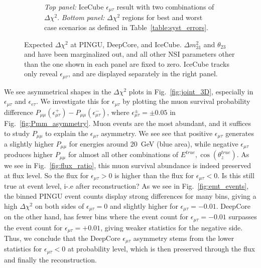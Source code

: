 \documentclass[draft=True]{revtex4-2}
\newcommand{\ztrue}{\ensuremath{\cos{(\theta_z^{true})}}}
\newcommand{\emt}{\ensuremath{\epsilon_{\mu\tau}}}
\newcommand{\eet}{\epsilon_{e\tau}}
\newcommand{\Etrue}{E^{true}}
\newcommand{\dm}{\Delta m^2_{31}}
\begin{document}
{\begin{figure}[!tb]
\begin{center}
\begin{subfigure}{0.45\textwidth}
         \caption{\emph{Top panel:} IceCube $\emt$ result with two combinations of $\Delta \chi^2$.
                  \emph{Bottom panel:} $\Delta \chi^2$ regions for best and worst case scenarios as defined in Table~\ref{table:syst_errors}.}\label{fig:IC_3D}
      \end{subfigure}
    \caption{Expected $\Delta \chi^2$ at PINGU, DeepCore, and IceCube.
    $\dm$ and $\theta_{23}$ and have been marginalized out, and all other NSI 
    parameters other than the one shown in each panel are fixed to zero. IceCube tracks only reveal $\emt$, and are displayed separately in the right panel.}\label{fig:3D_NO}
   \end{center}
\end{figure}

We see asymmetrical shapes in the $\Delta \chi^2$ plots in Fig.~\ref{fig:joint_3D}, especially in $\emt$ and $\eet$.%
We investigate this for $\emt$ by plotting the muon survival probability difference $P_{\mu\mu}(\epsilon^+_{\mu\tau}) - P_{\mu\mu}(\epsilon^-_{\mu\tau})$, where 
$\epsilon^\pm_{\mu\tau} = \pm 0.05$ in Fig.~\ref{fig:Pmm_asymmetry}. Muon events are the most abundant, and it suffices to study $P_{\mu\mu}$ to explain the $\emt$ asymmetry. 
We see see that positive $\emt$ generates a slightly higher $P_{\mu\mu}$ for energies around \SI{20}{\GeV} (blue area),
while negative $\emt$ produces higher $P_{\mu\mu}$ for almost all other combinations of ${\Etrue,\ztrue}$. As we see in Fig.~\ref{fig:flux_ratio}, this muon survival abundance 
is indeed preserved at flux level. So the flux for $\emt>0$ is higher than the flux for $\emt<0$. Is this still true at event level, i-.e after reconstruction? 
As we see in Fig.~\ref{fig:emt_events}, the binned PINGU event counts display strong differences for many bins, giving a high $\Delta \chi^2$ on both sides of $\emt=0$ and slightly higher for $\emt=-0.01$. DeepCore on the other hand, 
has fewer bins where the event count for $\emt=-0.01$ surpasses the event count for $\emt=+0.01$, giving weaker statistics for the negative side. Thus, we conclude that the DeepCore
$\emt$ asymmetry stems from the lower statistics for $\emt< 0 $ at probability level, which is then preserved through the flux and finally the reconstruction. %

}
\end{document}
